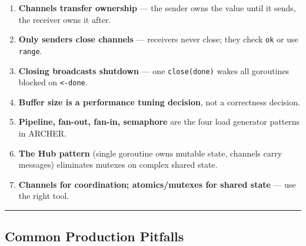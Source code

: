 \documentclass[11pt,a4paper,oneside]{book}
\providecommand{\tightlist}{\setlength{\itemsep}{0pt}\setlength{\parskip}{0pt}}
\begin{document}
\begin{enumerate}
\def\labelenumi{\arabic{enumi}.}
\tightlist
\item
  \textbf{Channels transfer ownership} --- the sender owns the value
  until it sends, the receiver owns it after.
\item
  \textbf{Only senders close channels} --- receivers never close; they
  check \texttt{ok} or use \texttt{range}.
\item
  \textbf{Closing broadcasts shutdown} --- one \texttt{close(done)}
  wakes all goroutines blocked on \texttt{\textless{}-done}.
\item
  \textbf{Buffer size is a performance tuning decision}, not a
  correctness decision.
\item
  \textbf{Pipeline, fan-out, fan-in, semaphore} are the four load
  generator patterns in ARCHER.
\item
  \textbf{The Hub pattern} (single goroutine owns mutable state,
  channels carry messages) eliminates mutexes on complex shared state.
\item
  \textbf{Channels for coordination; atomics/mutexes for shared state}
  --- use the right tool.
\end{enumerate}

\begin{center}\rule{0.5\linewidth}{0.5pt}\end{center}

\subsection{Common Production
Pitfalls}
\end{document}
